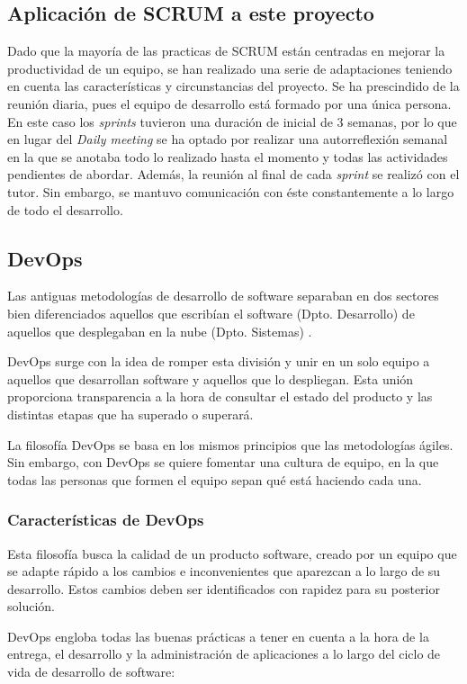 \subsection{Aplicación de SCRUM a este proyecto}
Dado que la mayoría de las practicas de SCRUM están centradas en mejorar la productividad de un equipo, se han realizado una serie de adaptaciones teniendo en cuenta las características y circunstancias del proyecto. Se ha prescindido de la reunión diaria, pues el equipo de desarrollo está formado por una única persona. En este caso los \textit{sprints} tuvieron una duración de inicial de 3 semanas, por lo que en lugar del \textit{Daily meeting} se ha optado por realizar una autorreflexión semanal en la que se anotaba todo lo realizado hasta el momento y todas las actividades pendientes de abordar. Además, la reunión al final de cada \textit{sprint} se realizó con el tutor. Sin embargo, se mantuvo comunicación con éste constantemente a lo largo de todo el desarrollo.

\subsection{DevOps}

Las antiguas metodologías de desarrollo de software separaban en dos sectores bien diferenciados aquellos que escribían el software (Dpto. Desarrollo) de aquellos que desplegaban en la nube (Dpto. Sistemas) \cite{devops5}.

DevOps surge con la idea de romper esta división y unir en un solo equipo a aquellos que desarrollan software y aquellos que lo despliegan. Esta unión proporciona transparencia a la hora de consultar el estado del producto y las distintas etapas que ha superado o superará.

La filosofía DevOps se basa en los mismos principios que las metodologías ágiles. Sin embargo, con DevOps se quiere fomentar una cultura de equipo, en la que todas las personas que formen el equipo sepan qué está haciendo cada una.

\subsubsection{Características de DevOps}
Esta filosofía busca la calidad de un producto software, creado por un equipo que se adapte rápido a los cambios e inconvenientes que aparezcan a lo largo de su desarrollo. Estos cambios deben ser identificados con rapidez para su posterior solución.

DevOps engloba todas las buenas prácticas a tener en cuenta a la hora de la entrega, el desarrollo y la administración de aplicaciones a lo largo del ciclo de vida de desarrollo de software: \cite{devops7}

